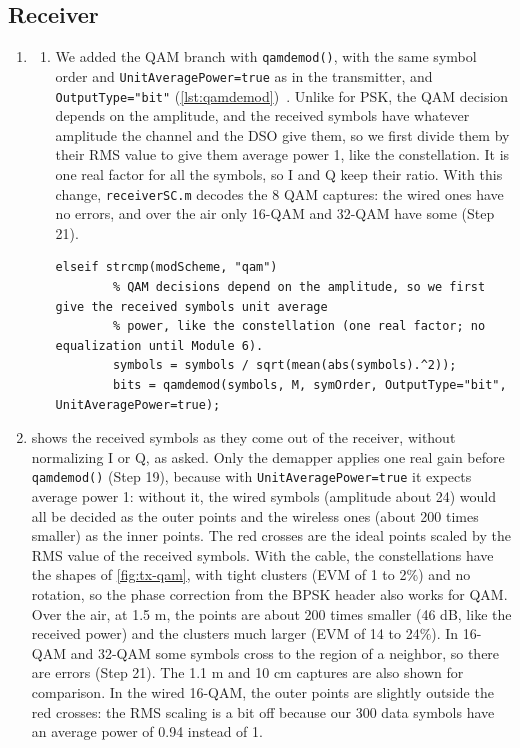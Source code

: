 \documentclass[11pt]{article}
\begin{document}
\subsection*{Receiver}
\begin{enumerate}[resume]
    \item
    \begin{enumerate}[label=\alph*)]
        \item We added the QAM branch with \texttt{qamdemod()}, with the same symbol order and \texttt{UnitAveragePower=true} as in the transmitter, and \texttt{OutputType="bit"} (\cref{lst:qamdemod})~\cite{qamdemod}. Unlike for PSK, the QAM decision depends on the amplitude, and the received symbols have whatever amplitude the channel and the DSO give them, so we first divide them by their RMS value to give them average power 1, like the constellation. It is one real factor for all the symbols, so I and Q keep their ratio. With this change, \texttt{receiverSC.m} decodes the 8 QAM captures: the wired ones have no errors, and over the air only 16-QAM and 32-QAM have some (Step 21).
\begin{lstlisting}[caption={Our change to \texttt{symbolDemapping.m} for M-QAM.}, label={lst:qamdemod}]
    elseif strcmp(modScheme, "qam")
        % QAM decisions depend on the amplitude, so we first give the received symbols unit average
        % power, like the constellation (one real factor; no equalization until Module 6).
        symbols = symbols / sqrt(mean(abs(symbols).^2));
        bits = qamdemod(symbols, M, symOrder, OutputType="bit", UnitAveragePower=true);
\end{lstlisting}
    \end{enumerate}

    \item {} shows the received symbols as they come out of the receiver, without normalizing I or Q, as asked. Only the demapper applies one real gain before \texttt{qamdemod()} (Step 19), because with \texttt{UnitAveragePower=true} it expects average power 1: without it, the wired symbols (amplitude about 24) would all be decided as the outer points and the wireless ones (about 200 times smaller) as the inner points. The red crosses are the ideal points scaled by the RMS value of the received symbols. With the cable, the constellations have the shapes of \cref{fig:tx-qam}, with tight clusters (EVM of 1 to 2\%) and no rotation, so the phase correction from the BPSK header also works for QAM. Over the air, at 1.5 m, the points are about 200 times smaller (46 dB, like the received power) and the clusters much larger (EVM of 14 to 24\%). In 16-QAM and 32-QAM some symbols cross to the region of a neighbor, so there are errors (Step 21). The 1.1 m and 10 cm captures are also shown for comparison. In the wired 16-QAM, the outer points are slightly outside the red crosses: the RMS scaling is a bit off because our 300 data symbols have an average power of 0.94 instead of 1.


\end{enumerate}
\end{document}
